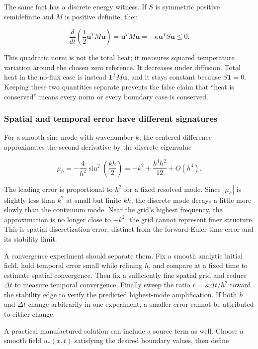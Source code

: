The same fact has a discrete energy witness. If \(S\) is symmetric positive semidefinite and \(M\) is positive definite, then

\[
\frac{d}{dt}\left(\frac12\mathbf u^TM\mathbf u\right)
=\mathbf u^TM\dot{\mathbf u}
=-\kappa\mathbf u^TS\mathbf u\le0.
\]

This quadratic norm is not the total heat; it measures squared temperature variation around the chosen zero reference. It decreases under diffusion. Total heat in the no-flux case is instead \(\mathbf1^TM\mathbf u\), and it stays constant because \(S\mathbf1=0\). Keeping these two quantities separate prevents the false claim that ``heat is conserved'' means every norm or every boundary case is conserved.

\subsubsection{Spatial and temporal error have different signatures}\label{02-foundations-ii-ch025-spatial-and-temporal-error-have-different-signatures}

For a smooth sine mode with wavenumber \(k\), the centered difference approximates the second derivative by the discrete eigenvalue

\[
\mu_h=-\frac{4}{h^2}\sin^2\left(\frac{kh}{2}\right)
=-k^2+\frac{k^4h^2}{12}+O(h^4).
\]

The leading error is proportional to \(h^2\) for a fixed resolved mode. Since \(|\mu_h|\) is slightly less than \(k^2\) at small but finite \(kh\), the discrete mode decays a little more slowly than the continuum mode. Near the grid's highest frequency, the approximation is no longer close to \(-k^2\); the grid cannot represent finer structure. This is spatial discretization error, distinct from the forward-Euler time error and its stability limit.

A convergence experiment should separate them. Fix a smooth analytic initial field, hold temporal error small while refining \(h\), and compare at a fixed time to estimate spatial convergence. Then fix a sufficiently fine spatial grid and reduce \(\Delta t\) to measure temporal convergence. Finally sweep the ratio \(r=\kappa\Delta t/h^2\) toward the stability edge to verify the predicted highest-mode amplification. If both \(h\) and \(\Delta t\) change arbitrarily in one experiment, a smaller error cannot be attributed to either change.

A practical manufactured solution can include a source term as well. Choose a smooth field \(u_*(x,t)\) satisfying the desired boundary values, then define

